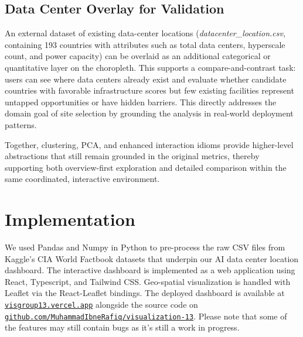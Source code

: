 \documentclass{vgtc}                          %
\begin{document}
\subsection{Data Center Overlay for Validation}
An external dataset of existing data-center locations (\textit{datacenter\_location.csv}, containing 193 countries with attributes such as total data centers, hyperscale count, and power capacity) can be overlaid as an additional categorical or quantitative layer on the choropleth. This supports a compare-and-contrast task: users can see where data centers already exist and evaluate whether candidate countries with favorable infrastructure scores but few existing facilities represent untapped opportunities or have hidden barriers. This directly addresses the domain goal of site selection by grounding the analysis in real-world deployment patterns.

Together, clustering, PCA, and enhanced interaction idioms provide higher-level abstractions that still remain grounded in the original metrics, thereby supporting both overview-first exploration and detailed comparison within the same coordinated, interactive environment.

\section{Implementation}
We used Pandas and Numpy in Python to pre-process the raw CSV files from Kaggle's CIA World Factbook datasets that underpin our AI data center location dashboard.
\smallskip
The interactive dashboard is implemented as a web application using React, Typescript, and Tailwind CSS. Geo-spatial visualization is handled with Leaflet via the React-Leaflet bindings. The deployed dashboard is available at
\href{https://visgroup13.vercel.app/}{\texttt{visgroup13.vercel.app}}
alongside the source code on
\href{https://github.com/MuhammadIbneRafiq/visualization-13}{\texttt{github.com/MuhammadIbneRafiq/visualization-13}}. Please note that some of the features may still contain bugs as it's still a work in progress.


% 
% 
% 
%
% 



\end{document}
